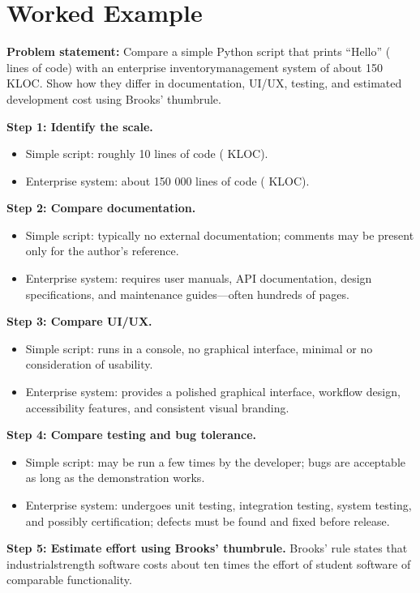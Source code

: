 \documentclass[12pt, a4paper]{article}
\begin{document}
\section{Worked Example}
\textbf{Problem statement:} Compare a simple Python script that prints ``Hello'' ( lines of code) with an enterprise inventorymanagement system of about 150 KLOC.  Show how they differ in documentation, UI/UX, testing, and estimated development cost using Brooks' thumbrule.  

\textbf{Step 1: Identify the scale.}  
\begin{itemize}
  \item Simple script: roughly 10 lines of code ( KLOC).  
  \item Enterprise system: about 150 000 lines of code ( KLOC).  
\end{itemize}

\textbf{Step 2: Compare documentation.}  
\begin{itemize}
  \item Simple script: typically no external documentation; comments may be present only for the author's reference.  
  \item Enterprise system: requires user manuals, API documentation, design specifications, and maintenance guides---often hundreds of pages.  
\end{itemize}

\textbf{Step 3: Compare UI/UX.}  
\begin{itemize}
  \item Simple script: runs in a console, no graphical interface, minimal or no consideration of usability.  
  \item Enterprise system: provides a polished graphical interface, workflow design, accessibility features, and consistent visual branding.  
\end{itemize}

\textbf{Step 4: Compare testing and bug tolerance.}  
\begin{itemize}
  \item Simple script: may be run a few times by the developer; bugs are acceptable as long as the demonstration works.  
  \item Enterprise system: undergoes unit testing, integration testing, system testing, and possibly certification; defects must be found and fixed before release.  
\end{itemize}

\textbf{Step 5: Estimate effort using Brooks' thumbrule.}  
Brooks' rule states that industrialstrength software costs about ten times the effort of student software of comparable functionality.  
\end{document}

